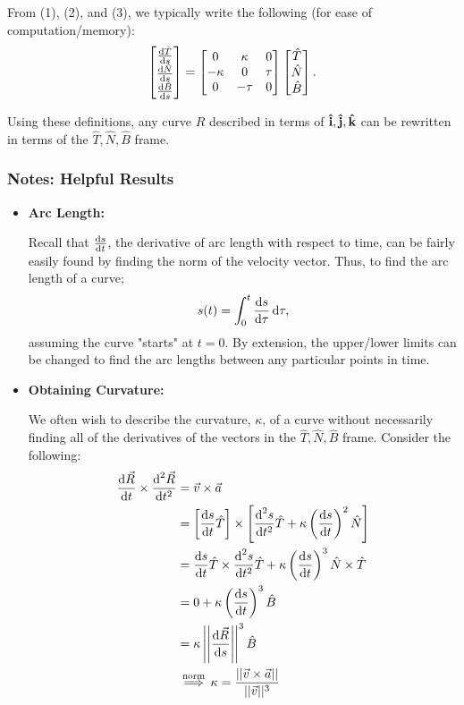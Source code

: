 \documentclass[12pt]{article}
\begin{document}
{From (1), (2), and (3), we typically write the following (for ease of computation/memory): \[\begin{bmatrix}
    \frac{\text{d}\hat{T}}{\text{d}s} \\
    \frac{\text{d}\hat{N}}{\text{d}s} \\
    \frac{\text{d}\hat{B}}{\text{d}s}
\end{bmatrix} = \begin{bmatrix}
   0 & \kappa & 0 \\
    -\kappa & 0 & \tau \\
    0 & -\tau & 0
\end{bmatrix} \begin{bmatrix}
    \hat{T} \\
    \hat{N} \\
    \hat{B}
\end{bmatrix}.\]

Using these definitions, any curve $R$ described in terms of $\vu{i}, \vu{j}, \vu{k}$ can be rewritten in terms of the $\hat{T}, \hat{N}, \hat{B}$ frame.

\subsubsection{Notes: Helpful Results}

\begin{itemize}

\item \textbf{Arc Length:}

Recall that $\frac{\text{d}s}{\text{d}t}$, the derivative of arc length with respect to time, can be fairly easily found by finding the norm of the velocity vector. Thus, to find the arc length of a curve; \[s(t) = \int_0^t \frac{\text{d}s}{\text{d}\tau} \, \text{d}\tau,\] assuming the curve "starts" at $t = 0$. By extension, the upper/lower limits can be changed to find the arc lengths between any particular points in time.

\item \textbf{Obtaining Curvature:}

We often wish to describe the curvature, $\kappa$, of a curve without necessarily finding all of the derivatives of the vectors in the $\hat{T}, \hat{N}, \hat{B}$ frame. Consider the following: 
\begin{align*}
    \frac{\text{d}\vec{R}}{\text{d}t} \times \frac{\text{d}^2\vec{R}}{\text{d}t^2} &= \vec{v} \times \vec{a}\\
    &=  \left[\frac{\text{d}s}{\text{d}t} \hat{T} \right] \times \left[\frac{\text{d}^2s}{\text{d}t^2} \hat{T} + \kappa \left(\frac{\text{d}s}{\text{d}t}\right)^2 \hat{N}\right]\\
    &= \frac{\text{d}s}{\text{d}t} \hat{T}\times \frac{\text{d}^2s}{\text{d}t^2} \hat{T} + \kappa \left(\frac{\text{d}s}{\text{d}t}\right)^3 \hat{N} \times \hat{T}\\
    &= 0 + \kappa \left(\frac{\text{d}s}{\text{d}t}\right)^3 \hat{B}\\
    &= \kappa \left|\left|\frac{\text{d}\vec{R}}{\text{d}s}\right|\right|^3 \hat{B}\\
    &\overset{\text{norm}}{\implies} \kappa = \frac{||\vec{v}\times\vec{a}||}{||\vec{v}||^3}
\end{align*}


\end{itemize}}
\end{document}
